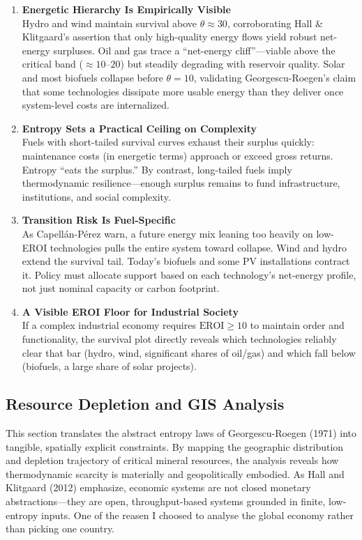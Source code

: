 \documentclass[a4paper,12pt]{article}
\begin{document}
\begin{enumerate}
    \item \textbf{Energetic Hierarchy Is Empirically Visible} \\
    Hydro and wind maintain survival above \(\theta \approx 30\), corroborating Hall \& Klitgaard’s assertion that only high-quality energy flows yield robust net-energy surpluses. Oil and gas trace a “net-energy cliff”—viable above the critical band (\(\approx 10\)–\(20\)) but steadily degrading with reservoir quality. Solar and most biofuels collapse before \(\theta = 10\), validating Georgescu-Roegen’s claim that some technologies dissipate more usable energy than they deliver once system-level costs are internalized.

    \item \textbf{Entropy Sets a Practical Ceiling on Complexity} \\
    Fuels with short-tailed survival curves exhaust their surplus quickly: maintenance costs (in energetic terms) approach or exceed gross returns. Entropy “eats the surplus.” By contrast, long-tailed fuels imply thermodynamic resilience—enough surplus remains to fund infrastructure, institutions, and social complexity.

    \item \textbf{Transition Risk Is Fuel-Specific} \\
    As Capellán-Pérez warn, a future energy mix leaning too heavily on low-EROI technologies pulls the entire system toward collapse. Wind and hydro extend the survival tail. Today's biofuels and some PV installations contract it. Policy must allocate support based on each technology’s net-energy profile, not just nominal capacity or carbon footprint.

    \item \textbf{A Visible EROI Floor for Industrial Society} \\
    If a complex industrial economy requires \(\text{EROI} \ge 10\) to maintain order and functionality, the survival plot directly reveals which technologies reliably clear that bar (hydro, wind, significant shares of oil/gas) and which fall below (biofuels, a large share of solar projects).
\end{enumerate}

\subsection{Resource Depletion and GIS Analysis}
\FloatBarrier
This section translates the abstract entropy laws of Georgescu-Roegen (1971) into tangible, spatially explicit constraints. By mapping the geographic distribution and depletion trajectory of critical mineral resources, the analysis reveals how thermodynamic scarcity is materially and geopolitically embodied. As Hall and Klitgaard (2012) emphasize, economic systems are not closed monetary abstractions—they are open, throughput-based systems grounded in finite, low-entropy inputs. One of the reasen I choosed to analyse the global economy rather than picking one country.
\end{document}
